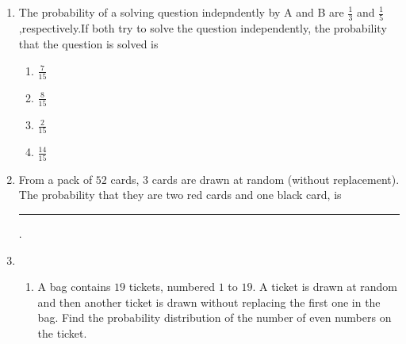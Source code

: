 \documentclass{article}
\begin{document}
\begin{enumerate}
	\item The probability of a solving question  indepndently by A and B are $\frac{1}{3}$ and $\frac{1}{5}$,respectively.If both try to solve the question independently, the probability that the question is solved is
	\begin{enumerate}%
		\item $\frac{7}{15}$
		\item $\frac{8}{15}$
		\item $\frac{2}{15}$
		\item $\frac{14}{15}$
			\end{enumerate}
		\item 
			From a pack of $52$ cards, $3$ cards are drawn at random (without replacement). The probability that they are two red cards and one black card, is\rule{1cm}{0.15mm}. 
	\item \begin{enumerate}%
			\item A bag contains $19$ tickets, numbered $1$ to $19$. A ticket is drawn at random and then another ticket is drawn without replacing the first one in the bag. Find the probability distribution of the number of even numbers on the ticket.
		

\end{enumerate}
\end{enumerate}
\end{document}
